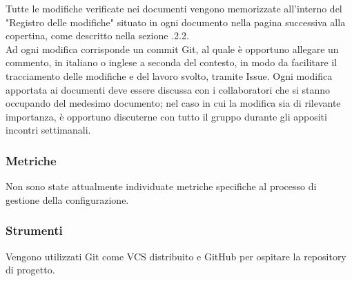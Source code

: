         Tutte le modifiche verificate nei documenti vengono memorizzate all'interno del "Registro delle modifiche" situato in ogni documento nella pagina successiva alla copertina, come descritto nella sezione .2.2.\\
        Ad ogni modifica corrisponde un commit Git, al quale è opportuno allegare un commento, in italiano o inglese a seconda del contesto, in modo da facilitare il tracciamento delle modifiche e del lavoro svolto, tramite Issue.
        Ogni modifica apportata ai documenti deve essere discussa con i collaboratori che si stanno occupando del medesimo documento; nel caso in cui la modifica sia di rilevante importanza, è opportuno discuterne con tutto il gruppo durante gli appositi incontri settimanali.
      \subsubsection{Metriche}
      Non sono state attualmente individuate metriche specifiche al processo di gestione della configurazione.
      \subsubsection{Strumenti}
      Vengono utilizzati Git come VCS distribuito e GitHub per ospitare la repository di progetto.
